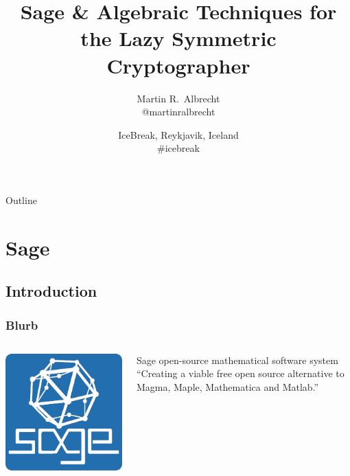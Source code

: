 \documentclass[9pt]{beamer}
\title{Sage \& Algebraic Techniques for the Lazy Symmetric Cryptographer}
\author{Martin R.\ Albrecht\\{@martinralbrecht}}
\institute{Crypto Group, DTU Compute, Denmark}
\date{IceBreak, Reykjavik, Iceland\\{\#icebreak}}
\begin{document}
\begin{frame}
\titlepage
\end{frame}

\begin{frame}{Outline}
\tableofcontents
\end{frame}

\section{Sage}

\subsection{Introduction}

\begin{frame}
\frametitle{Blurb}

\begin{columns}


\begin{center}
 \includegraphics[height=0.9\textwidth]{./sage-logo.png}
\vspace{0.5em}
\end{center}

\begin{block}{Sage open-source mathematical software system}
``Creating a viable free open source alternative to Magma, Maple, Mathematica and Matlab.''
\end{block}
\end{columns}


\end{frame}
\end{document}
